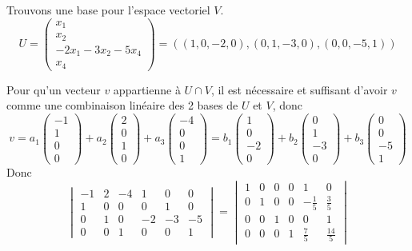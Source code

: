 \documentclass[]{book}
\theoremstyle{definition}
\begin{document}
Trouvons une base pour l'espace vectoriel $V$. 
$$U=\begin{pmatrix} x_1 \\ x_2 \\ -2x_1-3x_2-5x_4 \\ x_4 \end{pmatrix} = ((1,0,-2,0),(0,1,-3,0),(0,0,-5,1))$$ 

Pour qu'un vecteur $v$ appartienne \`a $U \cap V$, il est n\'ecessaire et suffisant d'avoir $v$ comme une combinaison lin\'eaire des 2 bases de $U$ et $V$, donc
$$
v= 
a_1\begin{pmatrix}-1\\1\\0\\0\end{pmatrix}+a_2\begin{pmatrix}2\\0\\1\\0\end{pmatrix}+a_3\begin{pmatrix}-4\\0\\0\\1\end{pmatrix} 
= b_1\begin{pmatrix}1\\0\\-2\\0\end{pmatrix}+b_2\begin{pmatrix}0\\1\\-3\\0\end{pmatrix}+b_3\begin{pmatrix}0\\0\\-5\\1\end{pmatrix}
$$
Donc
$$
\begin{vmatrix} -1&2&-4&1&0&0 \\ 1&0&0&0&1&0 \\ 0&1&0&-2&-3&-5 \\ 0&0&1&0&0&1 \end{vmatrix} = 
\begin{vmatrix} 1&0&0&0&1&0 \\ 0&1&0&0&-\frac{1}{5}&\frac{3}{5} \\ 0&0&1&0&0&1 \\ 0&0&0&1&\frac{7}{5}&\frac{14}{5} \end{vmatrix}
$$
\end{document}
